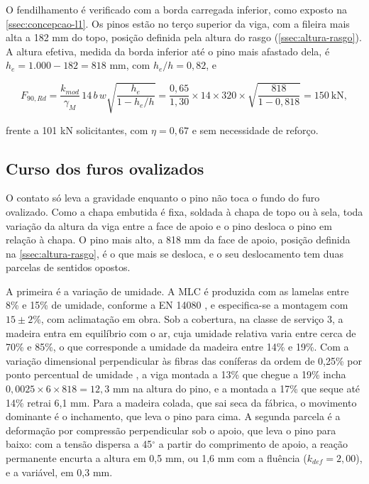 O fendilhamento é verificado com a borda carregada inferior, como exposto na
\autoref{ssec:concepcao-l1}. Os pinos estão no terço superior da viga, com a
fileira mais alta a 182 mm do topo, posição definida pela altura do rasgo
(\autoref{ssec:altura-rasgo}). A altura efetiva, medida da borda inferior até o
pino mais afastado dela, é $h_e = 1.000 - 182 = 818$ mm, com $h_e/h = 0{,}82$, e

\begin{equation}
    F_{90,Rd} = \frac{k_{mod}}{\gamma_M}\, 14\, b\, w \sqrt{\frac{h_e}{1 - h_e/h}}
    = \frac{0{,}65}{1{,}30} \times 14 \times 320 \times \sqrt{\frac{818}{1 - 0{,}818}}
    = 150~\text{kN},
    \label{eq:fendilhamento-l1}
\end{equation}

\noindent
frente a 101 kN solicitantes, com $\eta = 0{,}67$ e sem necessidade de reforço.

\subsection{Curso dos furos ovalizados}\label{ssec:curso-oblongos}

O contato só leva a gravidade enquanto o pino não toca o fundo do furo
ovalizado. Como a chapa embutida é fixa, soldada à chapa de topo ou à sela, toda
variação da altura da viga entre a face de apoio e o pino desloca o pino em
relação à chapa. O pino mais alto, a 818 mm da face de apoio, posição definida na
\autoref{ssec:altura-rasgo}, é o que mais se desloca, e o seu deslocamento tem duas parcelas de sentidos opostos.

A primeira é a variação de umidade. A MLC é produzida com as lamelas entre 8\%
e 15\% de umidade, conforme a EN 14080 \cite{EN14080:2013}, e especifica-se a
montagem com $15 \pm 2$\%, com aclimatação em obra. Sob a cobertura, na classe de
serviço 3, a madeira entra em equilíbrio com o ar, cuja umidade relativa varia
entre cerca de 70\% e 85\%, o que corresponde a umidade da madeira entre 14\% e
19\%. Com a variação dimensional perpendicular às fibras das coníferas da ordem de
0,25\% por ponto percentual de umidade \cite{thelandersson:2003}, a viga montada
a 13\% que chegue a 19\% incha
$0{,}0025 \times 6 \times 818 = 12{,}3$ mm na altura do pino, e a montada a 17\%
que seque até 14\% retrai 6,1 mm. Para a madeira colada, que sai seca da fábrica,
o movimento dominante é o inchamento, que leva o pino para cima. A segunda parcela
é a deformação por compressão perpendicular sob o apoio, que leva o pino para
baixo: com a tensão dispersa a 45$^{\circ}$ a partir do comprimento de apoio, a
reação permanente encurta a altura em 0,5 mm, ou 1,6 mm com a fluência
($k_{def} = 2{,}00$), e a variável, em 0,3 mm.

